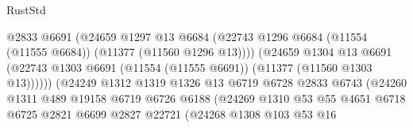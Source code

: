 \begin{lexlean}{RustStd}
\begin{coremodule}
                                          @2833
                                          @6691
                                          (@24659
                                            @1297
                                            @13
                                            @6684
                                            (@22743
                                              @1296
                                              @6684
                                              (@11554 (@11555 @6684))
                                              (@11377 (@11560 @1296 @13))))
                                          (@24659
                                            @1304
                                            @13
                                            @6691
                                            (@22743
                                              @1303
                                              @6691
                                              (@11554 (@11555 @6691))
                                              (@11377 (@11560 @1303 @13))))))
                                      (@24249
                                        @1312
                                        @1319
                                        @1326
                                        @13
                                        @6719
                                        @6728
                                        @2833
                                        @6743
                                        (@24260
                                          @1311
                                          @489
                                          @19158
                                          @6719
                                          @6726
                                          @6188
                                          (@24269
                                            @1310
                                            @53
                                            @55
                                            @4651
                                            @6718
                                            @6725
                                            @2821
                                            @6699
                                            @2827
                                            @22721
                                            (@24268
                                              @1308
                                              @103
                                              @53
                                              @16

\end{coremodule}
\end{lexlean}
